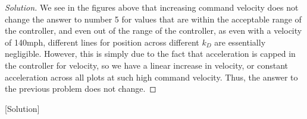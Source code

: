 \documentclass{article}
\begin{document}
\begin{proof}[Solution]
We see in the figures above that increasing command velocity does not change the answer to number 5 for values that are 
within the acceptable range of the controller, and even out of the range of the controller, as even with a velocity of 140mph, different lines for position across different $k_D$ are essentially negligible. However, this is simply due to the fact that acceleration is capped in the controller for velocity, so we have a linear increase in velocity, or constant acceleration across all plots at such high command velocity.
Thus, the answer to the previous problem does not change.
\end{proof}[Solution]
\end{document}
